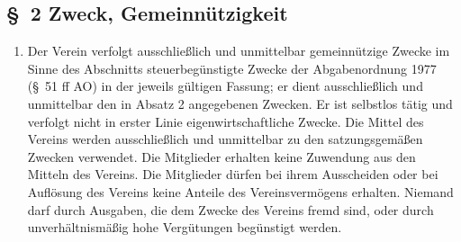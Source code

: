 \documentclass[10pt,a4paper]{scrartcl}
\newcommand{\qs}[1]{\glqq#1\grqq}
\begin{document}
\subsection*{\S \ 2 Zweck, Gemeinn{\"u}tzigkeit}
\begin{enumerate}
\item Der Verein verfolgt ausschlie{\ss}lich und unmittelbar gemeinn{\"u}tzige
Zwecke im Sinne des Abschnitts \qs{steuerbeg{\"u}nstigte Zwecke} der
Abgabenordnung 1977 (\S \ 51 ff AO) in der jeweils g{\"u}ltigen Fassung;
er dient ausschlie{\ss}lich und unmittelbar den in Absatz 2 angegebenen
Zwecken. Er ist selbstlos t{\"a}tig und verfolgt nicht in erster Linie eigenwirtschaftliche Zwecke.
Die Mittel des Vereins werden ausschlie{\ss}lich und unmittelbar zu den
satzungsgem{\"a}{\ss}en Zwecken verwendet. Die Mitglieder erhalten keine
Zuwendung aus den Mitteln des Vereins. Die Mitglieder d{\"u}rfen bei
ihrem Ausscheiden oder bei Aufl{\"o}sung des Vereins keine Anteile des
Vereinsverm{\"o}gens erhalten. Niemand darf durch Ausgaben, die dem
Zwecke des Vereins fremd sind, oder durch unverh{\"a}ltnism{\"a}{\ss}ig hohe
Ver\-g{\"u}\-tung\-en be\-g{\"u}ns\-tigt werden.


\end{enumerate}
\end{document}
